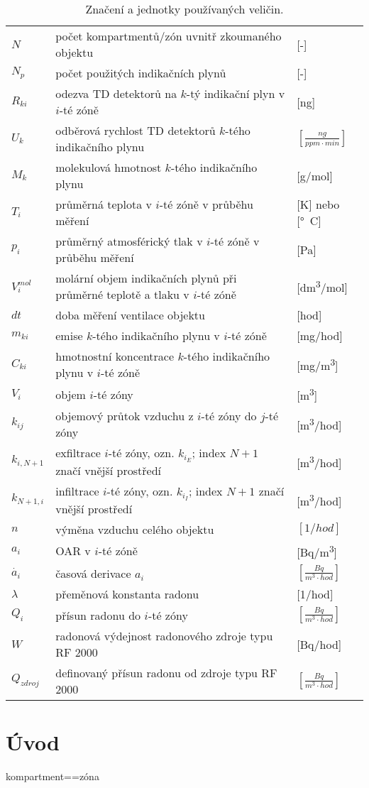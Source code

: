 \begin{table}[p]
\def\arraystretch{1.2}
    \centering
    \caption{Značení a jednotky používaných veličin.}
    \label{tab:veliciny}
    \begin{tabular}{lp{}l}
        \toprule
        $N$   & počet kompartmentů/zón uvnitř zkoumaného objektu&[-]\\
        $N_p$ & počet použitých indikačních plynů & [-]\\
        $R_{ki}$ & odezva TD detektorů na $k$-tý indikační plyn v $i$-té zóně &[\si{ng}]\\
        $U_k$ & odběrová rychlost TD detektorů $k$-tého indikačního plynu &$\left[\si{\frac{ng}{ppm\cdot min}}\right]$\\
        $M_{k}$ & molekulová hmotnost $k$-tého indikačního plynu &[\si{g/mol}]\\
        $T_i$ & průměrná teplota v $i$-té zóně v průběhu měření& [K] nebo [\si{\degree C}]\\
        $p_i$ & průměrný atmosférický tlak v $i$-té zóně v průběhu měření& [Pa]\\
        $V_{i}^{mol}$ & molární objem indikačních plynů při průměrné teplotě a tlaku v $i$-té zóně&[\si{dm^3/mol}]\\ 
        $dt$& doba měření ventilace objektu & [hod]\\
        $m_{ki}$ & emise $k$-tého indikačního plynu v $i$-té zóně & [\si{mg/hod}]\\
        $C_{ki}$ & hmotnostní koncentrace $k$-tého indikačního plynu v $i$-té zóně& [\si{mg/m^3}] \\
        $V_i$ & objem $i$-té zóny& [\si{m^3}] \\
        $k_{ij}$ & objemový průtok vzduchu z $i$-té zóny do $j$-té zóny& [\si{m^3/hod}]\\
        $k_{i, N+1}$ & exfiltrace $i$-té zóny, ozn. $k_{i_E}$; index $N+1$ značí vnější prostředí & [\si{m^3/hod}]\\
        $k_{N+1, i}$ & infiltrace $i$-té zóny, ozn. $k_{i_I}$; index $N+1$ značí vnější prostředí &[\si{m^3/hod}]\\
        $n$   & výměna vzduchu celého objektu & $[\si{1/hod}]$\\
        $a_i$ & OAR v $i$-té zóně& [\si{Bq/m^3}] \\
        $\dot{a_i}$ & časová derivace $a_i$ & $\left[\si{\frac{Bq}{m^3\cdot hod}}\right]$ \\
        $\lambda$ & přeměnová konstanta radonu& [\si{1/hod}]\\
        $Q_i$ & přísun radonu do $i$-té zóny& $\left[\si{\frac{Bq}{m^3\cdot hod}}\right]$ \\
        $W$ & radonová výdejnost radonového zdroje typu RF 2000 & [\si{Bq/hod}]\\
        $Q_{zdroj}$ & definovaný přísun radonu od zdroje typu RF 2000& $\left[\si{\frac{Bq}{m^3\cdot hod}}\right]$ \\
        \bottomrule
    \end{tabular}
\end{table}
\chapter{Úvod}
kompartment==zóna

